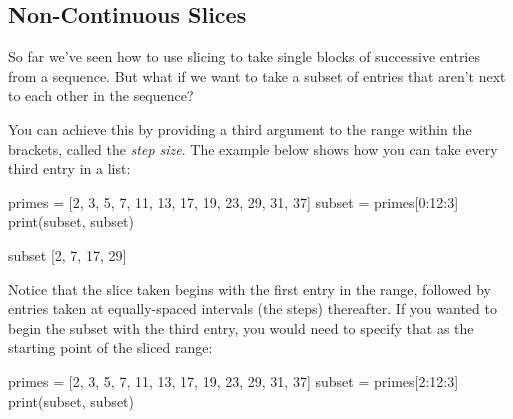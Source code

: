 \documentclass[
  letterpaper,
  DIV=11,
  numbers=noendperiod]{scrartcl}
\newenvironment{Shaded}{\begin{snugshade}}{\end{snugshade}}
\newcommand{\BuiltInTok}[1]{\textcolor[rgb]{0.00,0.23,0.31}{#1}}
\newcommand{\DecValTok}[1]{\textcolor[rgb]{0.68,0.00,0.00}{#1}}
\newcommand{\NormalTok}[1]{\textcolor[rgb]{0.00,0.23,0.31}{#1}}
\newcommand{\OperatorTok}[1]{\textcolor[rgb]{0.37,0.37,0.37}{#1}}
\newcommand{\StringTok}[1]{\textcolor[rgb]{0.13,0.47,0.30}{#1}}
\theoremstyle{remark}
\begin{document}
\subsection{Non-Continuous Slices}\label{non-continuous-slices}

So far we've seen how to use slicing to take single blocks of successive
entries from a sequence. But what if we want to take a subset of entries
that aren't next to each other in the sequence?

You can achieve this by providing a third argument to the range within
the brackets, called the \emph{step size}. The example below shows how
you can take every third entry in a list:

\begin{Shaded}
\begin{Highlighting}[]
\NormalTok{primes }\OperatorTok{=}\NormalTok{ [}\DecValTok{2}\NormalTok{, }\DecValTok{3}\NormalTok{, }\DecValTok{5}\NormalTok{, }\DecValTok{7}\NormalTok{, }\DecValTok{11}\NormalTok{, }\DecValTok{13}\NormalTok{, }\DecValTok{17}\NormalTok{, }\DecValTok{19}\NormalTok{, }\DecValTok{23}\NormalTok{, }\DecValTok{29}\NormalTok{, }\DecValTok{31}\NormalTok{, }\DecValTok{37}\NormalTok{]}
\NormalTok{subset }\OperatorTok{=}\NormalTok{ primes[}\DecValTok{0}\NormalTok{:}\DecValTok{12}\NormalTok{:}\DecValTok{3}\NormalTok{]}
\BuiltInTok{print}\NormalTok{(}\StringTok{\textquotesingle{}subset\textquotesingle{}}\NormalTok{, subset)}
\end{Highlighting}
\end{Shaded}

\begin{Shaded}
\begin{Highlighting}[]
\NormalTok{subset [2, 7, 17, 29]}
\end{Highlighting}
\end{Shaded}

Notice that the slice taken begins with the first entry in the range,
followed by entries taken at equally-spaced intervals (the steps)
thereafter. If you wanted to begin the subset with the third entry, you
would need to specify that as the starting point of the sliced range:

\begin{Shaded}
\begin{Highlighting}[]
\NormalTok{primes }\OperatorTok{=}\NormalTok{ [}\DecValTok{2}\NormalTok{, }\DecValTok{3}\NormalTok{, }\DecValTok{5}\NormalTok{, }\DecValTok{7}\NormalTok{, }\DecValTok{11}\NormalTok{, }\DecValTok{13}\NormalTok{, }\DecValTok{17}\NormalTok{, }\DecValTok{19}\NormalTok{, }\DecValTok{23}\NormalTok{, }\DecValTok{29}\NormalTok{, }\DecValTok{31}\NormalTok{, }\DecValTok{37}\NormalTok{]}
\NormalTok{subset }\OperatorTok{=}\NormalTok{ primes[}\DecValTok{2}\NormalTok{:}\DecValTok{12}\NormalTok{:}\DecValTok{3}\NormalTok{]}
\BuiltInTok{print}\NormalTok{(}\StringTok{\textquotesingle{}subset\textquotesingle{}}\NormalTok{, subset)}
\end{Highlighting}
\end{Shaded}
\end{document}
